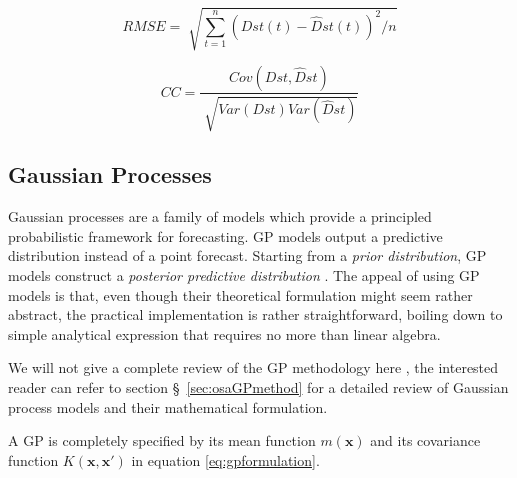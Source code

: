 \begin{equation}\label{eq:rmse}
 RMSE = \sqrt[]{ \sum_{t=1}^{n} \left( Dst \left( t \right) - \hat{D}st \left( t \right)  \right) ^{2}/n}
\end{equation}

\begin{equation}\label{eq:cc}
 CC = \frac{Cov \left( Dst, \hat{D}st \right)}{\sqrt[]{Var \left( Dst \right) Var \left( \hat{D}st \right)}} 
\end{equation}


\subsection{Gaussian Processes}\label{sec:gpcomponent}




Gaussian processes are a family of models which provide a principled probabilistic framework for forecasting.
GP models output a predictive distribution instead of a point forecast. Starting from a \emph{prior distribution},
GP models construct a \emph{posterior predictive distribution} . The appeal of using GP models is that, even though 
their theoretical formulation might seem rather abstract, the practical implementation is rather straightforward, 
boiling down to simple analytical expression that requires no more than linear algebra. 

We will not give a complete review of the GP methodology here , the interested reader can refer to 
section \S~\ref{sec:osaGPmethod} for a detailed review of Gaussian process models and their mathematical formulation.

A GP is completely specified by its mean function  \( m \left( \mathbf{x} \right)  \) and its covariance function  
\( K (\mathbf{x}, \mathbf{x}') \)  in equation \ref{eq:gpformulation}. 

